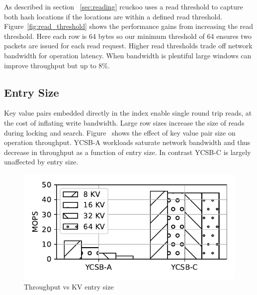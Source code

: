 As described in section ~\ref{sec:reading} rcuckoo uses a
read threshold to capture both hash locations if the
locations are within a defined read threshold.
Figure~\ref{fig:read_threshold} shows the performance gains
from increasing the read threshold. Here each row is 64
bytes so our minimum threshold of 64 ensures two packets are
issued for each read request. Higher read thresholds trade
off network bandwidth for operation latency. When bandwidth
is plentiful large windows can improve throughput but up to
8\%.



\subsection{Entry Size}

Key value pairs embedded directly in the index enable single
round trip reads, at the cost of inflating write bandwidth.
Large row sizes increase the size of reads during locking
and search. Figure~\cite{fig:entry_size} shows the effect of
key value pair size on operation throughput. YCSB-A
workloads saturate network bandwidth and thus decrease in
throughput as a function of entry size. In contrast YCSB-C
is largely unaffected by entry size. 


\begin{figure}[ht]
    \includegraphics[width=0.99\linewidth]{fig/entry_size.pdf}
    \caption{Throughput vs KV entry size}
    \label{fig:entry_size}
\end{figure}


